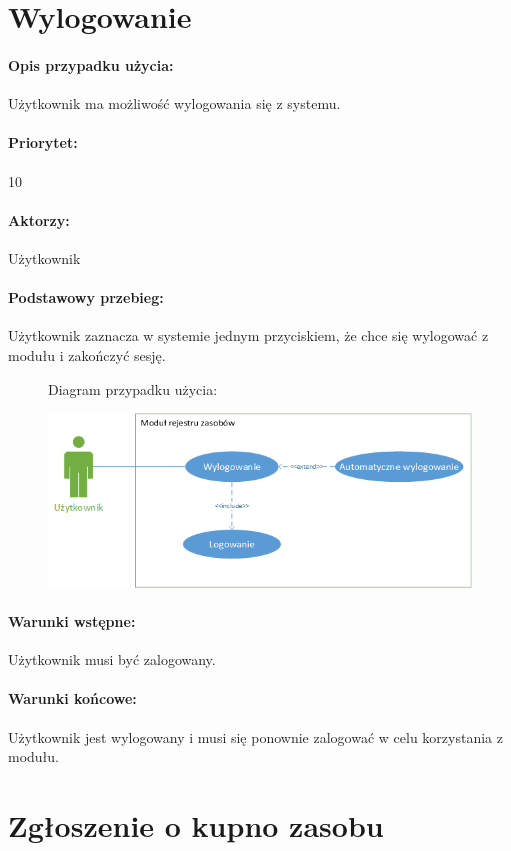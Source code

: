 \documentclass[11pt, a4paper, oneside]{report}
\begin{document}
\section{Wylogowanie}
\paragraph{Opis przypadku użycia:} Użytkownik ma możliwość wylogowania się z systemu.
\paragraph{Priorytet:} 10
\paragraph{Aktorzy:} Użytkownik
\paragraph{Podstawowy przebieg:}
Użytkownik zaznacza w systemie jednym przyciskiem, że chce się wylogować z modułu i zakończyć sesję.

\begin{figure}[H]
Diagram przypadku użycia:

\centering
\includegraphics[scale=1]{uzytkownik_wylog.png}
\end{figure}

\paragraph{Warunki wstępne:} Użytkownik musi być zalogowany.
\paragraph{Warunki końcowe:} Użytkownik jest wylogowany i musi się ponownie zalogować w celu korzystania z modułu.

\section{Zgłoszenie o kupno zasobu}
\end{document}
